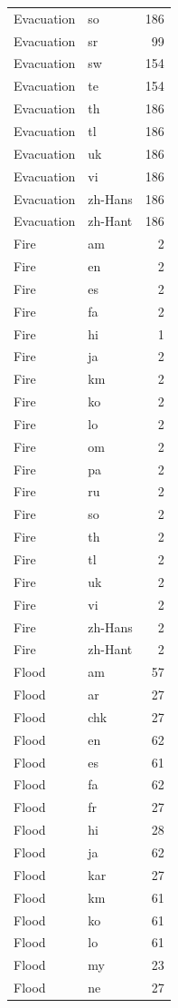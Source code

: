 \begin{longtable}{p{3cm} p{3cm} r}
Evacuation & so & 186 \\
Evacuation & sr & 99 \\
Evacuation & sw & 154 \\
Evacuation & te & 154 \\
Evacuation & th & 186 \\
Evacuation & tl & 186 \\
Evacuation & uk & 186 \\
Evacuation & vi & 186 \\
Evacuation & zh-Hans & 186 \\
Evacuation & zh-Hant & 186 \\
Fire & am & 2 \\
Fire & en & 2 \\
Fire & es & 2 \\
Fire & fa & 2 \\
Fire & hi & 1 \\
Fire & ja & 2 \\
Fire & km & 2 \\
Fire & ko & 2 \\
Fire & lo & 2 \\
Fire & om & 2 \\
Fire & pa & 2 \\
Fire & ru & 2 \\
Fire & so & 2 \\
Fire & th & 2 \\
Fire & tl & 2 \\
Fire & uk & 2 \\
Fire & vi & 2 \\
Fire & zh-Hans & 2 \\
Fire & zh-Hant & 2 \\
Flood & am & 57 \\
Flood & ar & 27 \\
Flood & chk & 27 \\
Flood & en & 62 \\
Flood & es & 61 \\
Flood & fa & 62 \\
Flood & fr & 27 \\
Flood & hi & 28 \\
Flood & ja & 62 \\
Flood & kar & 27 \\
Flood & km & 61 \\
Flood & ko & 61 \\
Flood & lo & 61 \\
Flood & my & 23 \\
Flood & ne & 27 \\

\end{longtable}

